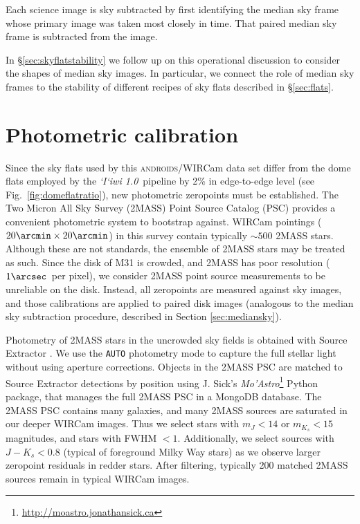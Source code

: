 \documentclass[iop]{emulateapj}
\newcommand{\sw}[1]{\textit{#1}} %
\newcommand{\iiwione}{\sw{`I`iwi 1.0}}
\newcommand{\androids}{\textsc{androids}}
\newcommand{\Fig}[1]{Fig.~\ref{fig:#1}}  %
\newcommand{\Sec}[1]{\S\ref{sec:#1}}  %
\begin{document}
Each science image is sky subtracted by first identifying the median sky frame whose primary image was taken most closely in time.
That paired median sky frame is subtracted from the image.

In \Sec{skyflatstability} we follow up on this operational discussion to consider the shapes of median sky images. In particular, we connect the role of median sky frames to the stability of different recipes of sky flats described in \Sec{flats}.

\section{Photometric calibration}
\label{sec:photocal}

Since the sky flats used by this \androids/WIRCam data set differ from the dome flats employed by the \iiwione\ pipeline by 2\% in edge-to-edge level (see \Fig{domeflatratio}), new photometric zeropoints must be established.
The Two Micron All Sky Survey (2MASS) Point Source Catalog (PSC) \citep{Skrutskie:2006} provides a convenient photometric system to bootstrap against.
WIRCam pointings ($20\arcmin \times 20\arcmin$) in this survey contain typically $\sim 500$ 2MASS stars.
Although these are not standards, the ensemble of 2MASS stars may be treated as such.
Since the disk of M31 is crowded, and 2MASS has poor resolution ($1\arcsec$~per pixel), we consider 2MASS point source measurements to be unreliable on the disk.
Instead, all zeropoints are measured against sky images, and those calibrations are applied to paired disk images (analogous to the median sky subtraction procedure, described in Section \ref{sec:mediansky}).

Photometry of 2MASS stars in the uncrowded sky fields is obtained with Source Extractor \citep{Bertin:1996}.
We use the \texttt{AUTO} photometry mode to capture the full stellar light without using aperture corrections.
Objects in the 2MASS PSC are matched to Source Extractor detections by position using J. Sick's \sw{Mo'Astro}\footnote{\url{http://moastro.jonathansick.ca}} Python package, that manages the full 2MASS PSC in a MongoDB database.
The 2MASS PSC contains many galaxies, and many 2MASS sources are saturated in our deeper WIRCam images.
Thus we select stars with $m_J < 14$ or $m_{K_s} < 15$ magnitudes, and stars with FWHM $<1$\arcsec.
Additionally, we select sources with $J-K_s < 0.8$ (typical of foreground Milky Way stars) as we observe larger zeropoint residuals in redder stars.
After filtering, typically 200 matched 2MASS sources remain in typical WIRCam images.
\end{document}
